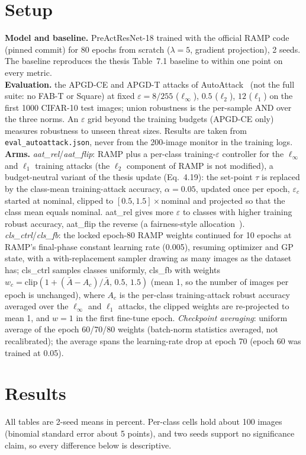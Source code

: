 \documentclass[11pt]{article}
\begin{document}
\section{Setup}
\textbf{Model and baseline.} PreActResNet-18 trained with the official RAMP code (pinned commit) for 80 epochs from
scratch ($\lambda=5$, gradient projection), 2 seeds. The baseline reproduces the thesis Table~7.1 baseline to within one
point on every metric.\\
\textbf{Evaluation.} the APGD-CE and APGD-T attacks of AutoAttack~\cite{aa} (not the full suite: no FAB-T or Square) at fixed $\varepsilon=8/255$ ($\ell_\infty$), $0.5$
($\ell_2$), $12$ ($\ell_1$) on the first 1000 CIFAR-10 test images; union robustness is the per-sample AND over the three
norms. An $\varepsilon$ grid beyond the training budgets (APGD-CE only) measures robustness to unseen threat sizes.
Results are taken from \texttt{eval\_autoattack.json}, never from the 200-image monitor in the training logs.\\
\textbf{Arms.}
\emph{aat\_rel}/\emph{aat\_flip}: RAMP plus a per-class training-$\varepsilon$ controller for the $\ell_\infty$ and $\ell_1$ training attacks (the $\ell_2$ component of RAMP is not modified), a budget-neutral variant of the thesis update (Eq.~4.19): the set-point $\tau$ is replaced by the class-mean training-attack accuracy, $\alpha=0.05$, updated once per epoch, $\varepsilon_c$ started at nominal, clipped to $[0.5,1.5]\times$nominal and projected so that the class mean equals nominal. aat\_rel gives more $\varepsilon$ to classes with higher training robust accuracy, aat\_flip the reverse (a fairness-style allocation~\cite{frl}).
\emph{cls\_ctrl}/\emph{cls\_fb}: the locked epoch-80 RAMP weights continued for 10 epochs at RAMP's final-phase constant learning rate (0.005), resuming optimizer and GP state, with a
with-replacement sampler drawing as many images as the dataset has; cls\_ctrl samples classes uniformly, cls\_fb with weights
$w_c=\mathrm{clip}(1+(\bar A-A_c)/\bar A,\,0.5,\,1.5)$ (mean 1, so the number of images per epoch is unchanged), where $A_c$ is
the per-class training-attack robust accuracy averaged over the $\ell_\infty$ and $\ell_1$ attacks, the clipped weights are re-projected to mean 1, and $w=1$ in the first fine-tune epoch.
\emph{Checkpoint averaging}: uniform average of the epoch 60/70/80 weights (batch-norm statistics averaged, not recalibrated); the average spans the learning-rate drop at epoch 70 (epoch 60 was trained at 0.05).

\section{Results}
All tables are 2-seed means in percent. Per-class cells hold about 100 images (binomial standard error about 5 points),
and two seeds support no significance claim, so every difference below is descriptive.
\end{document}
